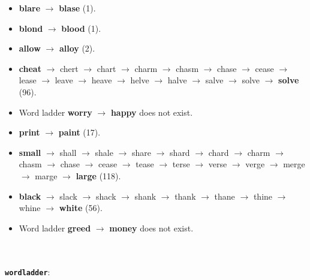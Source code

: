 \documentclass{article}
\begin{document}
\begin{itemize}
    \item \textbf{blare} $\rightarrow$ \textbf{blase} (1).
    \item \textbf{blond} $\rightarrow$ \textbf{blood} (1).
    \item \textbf{allow} $\rightarrow$ \textbf{alloy} (2).
    \item \textbf{cheat} $\rightarrow$ chert $\rightarrow$ chart $\rightarrow$ charm $\rightarrow$ chasm $\rightarrow$ chase $\rightarrow$ cease $\rightarrow$ lease $\rightarrow$ leave $\rightarrow$ heave $\rightarrow$ helve $\rightarrow$ halve $\rightarrow$ salve $\rightarrow$ solve $\rightarrow$ \textbf{solve} (96).
    \item Word ladder \textbf{worry} $\rightarrow$ \textbf{happy} does not exist.
    \item \textbf{print} $\rightarrow$ \textbf{paint} (17).
    \item \textbf{small} $\rightarrow$ shall $\rightarrow$ shale $\rightarrow$ share $\rightarrow$ shard $\rightarrow$ chard $\rightarrow$ charm $\rightarrow$ chasm $\rightarrow$ chase $\rightarrow$ cease $\rightarrow$ tease $\rightarrow$ terse $\rightarrow$ verse $\rightarrow$ verge $\rightarrow$ merge $\rightarrow$ marge $\rightarrow$ \textbf{large} (118).
    \item \textbf{black} $\rightarrow$ slack $\rightarrow$ shack $\rightarrow$ shank $\rightarrow$ thank $\rightarrow$ thane $\rightarrow$ thine $\rightarrow$ whine $\rightarrow$ \textbf{white} (56).
    \item Word ladder \textbf{greed} $\rightarrow$ \textbf{money} does not exist.
\end{itemize}
\\\\
\texttt{\textbf{wordladder}}:
\end{document}
